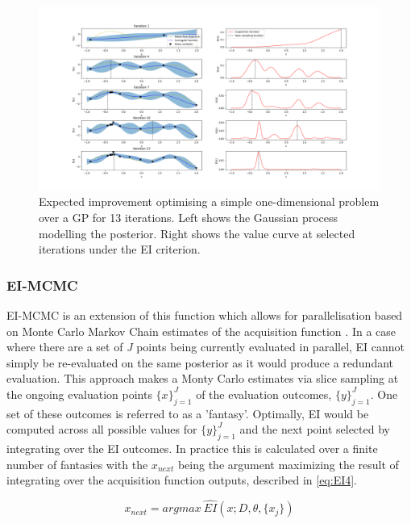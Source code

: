 \documentclass{article}
\begin{document}
			\begin{figure}[h]

			\includegraphics[trim=20 0 0 0 ,scale=0.25]{EIsimp.png}

			\caption{
			Expected improvement optimising a simple one-dimensional problem over a GP for 13 iterations. Left shows the Gaussian process modelling the posterior. Right shows the value curve at selected iterations under the EI criterion.
			}
			\label{fig:EI1}

			\end{figure}

			\subsubsection{EI-MCMC}\label{EI-MCMC}

			EI-MCMC is an extension of this function which allows for parallelisation based on Monte Carlo Markov Chain estimates of the acquisition function \cite{17}. In a case where there are a set of \textit{J} points being currently evaluated in parallel, EI cannot simply be re-evaluated on the same posterior as it would produce a redundant evaluation. This approach makes a Monty Carlo estimates via slice sampling at the ongoing evaluation points \({\{x\}}_{j=1}^J\) of the evaluation outcomes, \(\{y\}_{j=1}^J\). One set of these outcomes is referred to as a 'fantasy'. Optimally, EI would be computed across all possible values for \(\{y\}_{j=1}^J\) and the next point selected by integrating over the EI outcomes. In practice this is calculated over a finite number of fantasies with the \(x_{next}\) being the argument maximizing the result of integrating over the acquisition function outputs, described in \ref{eq:EI4}.

			\begin{equation}\label{eq:EI4} x_{next} = argmax~ \widehat{EI}(x; D, \theta,\{x_j\})\end{equation}
\end{document}
